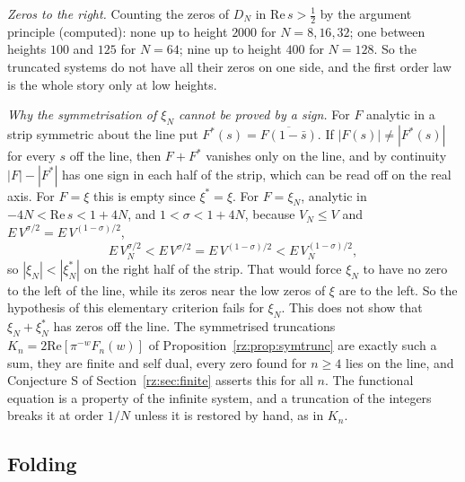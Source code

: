 \emph{Zeros to the right.} Counting the zeros of $D_N$ in $\mathrm{Re}\,s>\frac12$ by the argument principle (computed): none up to height $2000$ for $N=8,16,32$; one between heights $100$ and $125$ for $N=64$; nine up to height $400$ for $N=128$. So the truncated systems do not have all their zeros on one side, and the first order law is the whole story only at low heights.

\emph{Why the symmetrisation of $\xi_N$ cannot be proved by a sign.} For $F$ analytic in a strip symmetric about the line put $F^*(s)=\overline{F(1-\bar s)}$. If $|F(s)|\ne|F^*(s)|$ for every $s$ off the line, then $F+F^*$ vanishes only on the line, and by continuity $|F|-|F^*|$ has one sign in each half of the strip, which can be read off on the real axis. For $F=\xi$ this is empty since $\xi^*=\xi$. For $F=\xi_N$, analytic in $-4N<\mathrm{Re}\,s<1+4N$, and $1<\sigma<1+4N$, because $V_N\le V$ and $E\,V^{\sigma/2}=E\,V^{(1-\sigma)/2}$,
\[
E\,V_N^{\sigma/2}<E\,V^{\sigma/2}=E\,V^{(1-\sigma)/2}<E\,V_N^{(1-\sigma)/2},
\]
so $|\xi_N|<|\xi_N^*|$ on the right half of the strip. That would force $\xi_N$ to have no zero to the left of the line, while its zeros near the low zeros of $\xi$ are to the left. So the hypothesis of this elementary criterion fails for $\xi_N$. This does not show that $\xi_N+\xi_N^*$ has zeros off the line. The symmetrised truncations $K_n=2\mathrm{Re}[\pi^{-w}F_n(w)]$ of Proposition~\ref{rz:prop:symtrunc} are exactly such a sum, they are finite and self dual, every zero found for $n\ge4$ lies on the line, and Conjecture S of Section~\ref{rz:sec:finite} asserts this for all $n$. The functional equation is a property of the infinite system, and a truncation of the integers breaks it at order $1/N$ unless it is restored by hand, as in $K_n$.

\subsection{Folding}\label{lxi:sub:fold}

